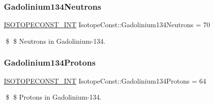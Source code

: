 \subsubsection{\texorpdfstring{Gadolinium134\+Neutrons}{Gadolinium134Neutrons}}
{\footnotesize\ttfamily \mbox{\hyperlink{group___isotope_const-_macros_ga5f18360b3e99483a35c32d789e62621c}{I\+S\+O\+T\+O\+P\+E\+C\+O\+N\+S\+T\+\_\+\+I\+NT}} Isotope\+Const\+::\+Gadolinium134\+Neutrons = 70}

\$ \$ Neutrons in Gadolinium-\/134. \mbox{\label{group___isotope_const-_gadolinium-_gd134_ga08653d091487b1f74a8a8a82caadd2c5}} 
\subsubsection{\texorpdfstring{Gadolinium134\+Protons}{Gadolinium134Protons}}
{\footnotesize\ttfamily \mbox{\hyperlink{group___isotope_const-_macros_ga5f18360b3e99483a35c32d789e62621c}{I\+S\+O\+T\+O\+P\+E\+C\+O\+N\+S\+T\+\_\+\+I\+NT}} Isotope\+Const\+::\+Gadolinium134\+Protons = 64}

\$ \$ Protons in Gadolinium-\/134. 